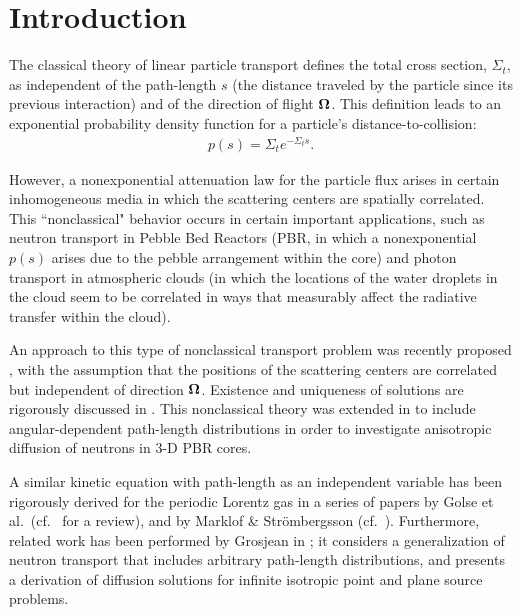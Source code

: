\documentclass[12pt]{article}
\newcommand{\uomega}{{\bf \Omega}}
\begin{document}
\pagebreak

\doublespacing

\section{Introduction}

The classical theory of linear particle transport defines the total cross section, $\Sigma_t$, as independent of the path-length $s$ (the distance traveled by the particle since its previous interaction) and of the direction of flight $\uomega$.
This definition leads to an exponential probability density function for a particle's distance-to-collision:
\begin{align}\label{eq1}
p(s) = \Sigma_t e^{-\Sigma_t s}.
\end{align}

However, a nonexponential attenuation law for the particle flux arises in certain inhomogeneous media in which the scattering centers are spatially correlated.
This ``nonclassical" behavior occurs in certain important applications, such as neutron transport in Pebble Bed Reactors (PBR, in which a nonexponential $p(s)$ arises due to the pebble arrangement within the core) and photon transport in atmospheric clouds (in which the locations of the water droplets in the cloud seem to be correlated in ways that measurably affect the radiative transfer within the cloud).

An approach to this type of nonclassical transport problem was recently proposed \cite{lar07,larvas11}, with the assumption that the positions of the scattering centers are correlated but independent of direction $\uomega$.
Existence and uniqueness of solutions are rigorously discussed in \cite{fra10}.
This nonclassical theory was extended in \cite{vaslar14a} to include angular-dependent path-length distributions in order to investigate anisotropic diffusion of neutrons in 3-D PBR cores.

A similar kinetic equation with path-length as an independent variable has been rigorously derived for the periodic Lorentz gas in a series of papers by Golse et al.~(cf.~\cite{gol12} for a review), and by Marklof \& Str\"ombergsson (cf.~\cite{mar11,mar15}).
Furthermore, related work has been performed by Grosjean in \cite{gro51}; it considers a generalization of neutron transport that includes arbitrary path-length distributions, and presents a derivation of diffusion solutions for infinite isotropic point and plane source problems.
 
\end{document}
